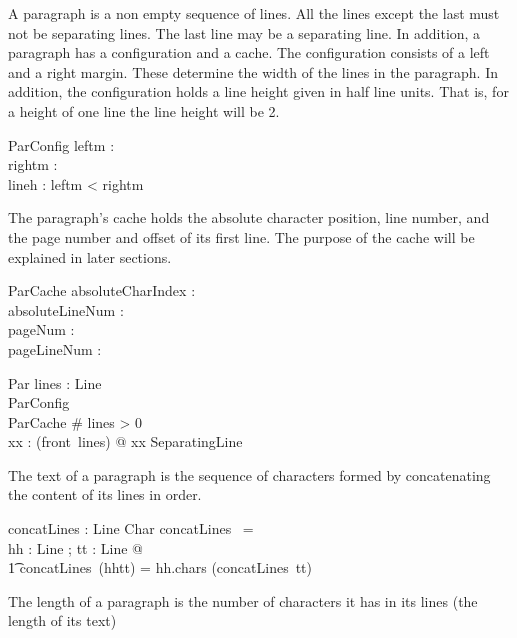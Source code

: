 \documentclass{article}
\begin{document}
A paragraph is a non empty sequence of lines. All the lines except the last must not be separating lines. The last line may be a separating line. In addition, a paragraph has a configuration and a cache. The configuration consists of a left and a right margin. These determine the width of the lines in the paragraph. In addition, the configuration holds a line height given in half line units. That is, for a height of one line the line height will be 2.

\begin{schema}{ParConfig}
  leftm : \nat \\
  rightm : \nat \\
  lineh : \nat
\where
  leftm < rightm \\
\end{schema}

The paragraph's cache holds the absolute character position, line number, and the page number and offset of its first line. The purpose of the cache will be explained in later sections.

\begin{schema}{ParCache}
	absoluteCharIndex : \nat \\
	absoluteLineNum : \nat \\
	pageNum : \nat \\
	pageLineNum : \nat
\end{schema}

\begin{schema}{Par}
  lines : \seq Line \\
  ParConfig \\
  ParCache 
\where
  \# lines > 0 \\
  \forall xx : \ran (front~lines) @ xx \notin SeparatingLine
 \end{schema}

The text of a paragraph is the sequence of characters formed by concatenating the content of its lines in order.

\begin{axdef}
	concatLines : \seq Line \fun \seq Char
\where
	concatLines ~\langle\rangle = \langle\rangle \\
	\forall hh : Line ; tt : \seq Line @ \\
	\t1 concatLines~(\langle hh\rangle \cat tt) = hh.chars \cat (concatLines~tt)
\end{axdef}

The length of a paragraph is the number of characters it has in its lines (the length of its text)
\end{document}
